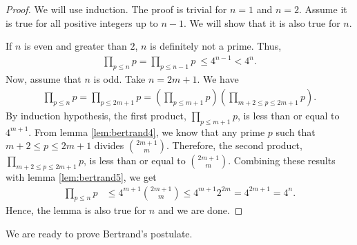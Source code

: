 \documentclass{subfile}
\begin{document}
	\begin{proof}
		We will use induction. The proof is trivial for $n=1$ and $n=2$. Assume it is true for all positive integers up to $n-1$. We will show that it is also true for $n$.
		
		If $n$ is even and greater than $2$, $n$ is definitely not a prime. Thus,
		\begin{align*}
			\prod_{p\leq n}p =  \prod_{p\leq n-1}p\ \leq  4^{n-1}<  4^n.
		\end{align*}
		Now, assume that $n$ is odd. Take $n=2m+1$. We have
		\begin{align*}
			\prod_{p\leq n}p =	\prod_{p\leq 2m+1} p  = \left(\prod_{p\leq m+1}p \right) \left( \prod_{m+2\leq p\leq2m+1}p\right).
		\end{align*}
		By induction hypothesis, the first product, $\prod\limits_{p\leq m+1}p$, is less than or equal to $4^{m+1}$. From lemma \eqref{lem:bertrand4}, we know that any prime $p$ such that $m+2\leq p\leq2m+1$ divides $\binom{2m+1}{m}$. Therefore, the second product, $\prod\limits_{m+2\leq p\leq2m+1}p$, is less than or equal to $\binom{2m+1}{m}$. Combining these results with lemma \eqref{lem:bertrand5}, we get
		\begin{align*}
			\prod_{p\leq n}p &\leq 4^{m+1}\binom{2m+1}{m}\leq 4^{m+1}2^{2m} =  4^{2m+1} = 4^n.
		\end{align*}
		Hence, the lemma is also true for $n$ and we are done.
	\end{proof}
	
	We are ready to prove Bertrand's postulate.
	
\end{document}
